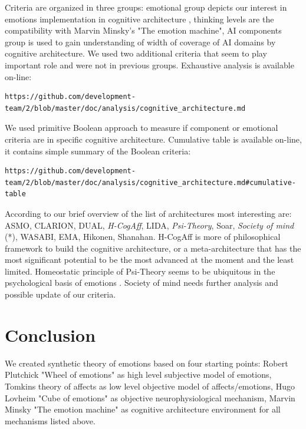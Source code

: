 Criteria are organized in three groups: emotional group depicts our interest in emotions implementation in cognitive architecture \cite{computationalmodelsemotionscognition}, thinking levels are the compatibility with Marvin Minsky's "The emotion machine", AI components group is used to gain understanding of width of coverage of AI domains by cognitive architecture. We used two additional criteria that seem to play important role and were not in previous groups. Exhaustive analysis is available on-line:

\begin{verbatim}
https://github.com/development-team/2/blob/master/doc/analysis/cognitive_architecture.md
\end{verbatim}

We used primitive Boolean approach to measure if component or emotional criteria are in specific cognitive architecture. Cumulative table is available on-line, it contains simple summary of the Boolean criteria:

\begin{verbatim}
https://github.com/development-team/2/blob/master/doc/analysis/cognitive_architecture.md#cumulative-table
\end{verbatim}

According to our brief overview of the list of architectures most interesting are: ASMO, CLARION, DUAL, \emph{H-CogAff}, LIDA, \emph{Psi-Theory}, Soar, \emph{Society of mind} (*), WASABI, EMA, Hikonen, Shanahan.
H-CogAff is more of philosophical framework to build the cognitive architecture, or a meta-architecture that has the most significant potential to be the most advanced at the moment and the least limited. Homeostatic principle of Psi-Theory seems to be ubiquitous in the psychological basis of emotions \cite{natureofemotions}. Society of mind needs further analysis and possible update of our criteria.

\section{Conclusion}

We created synthetic theory of emotions based on four starting points: Robert Plutchick "Wheel of emotions" \cite{natureofemotions, senticcomputing} as high level subjective model of emotions, Tomkins theory of affects \cite{primer_affect_psychology} as low level objective model of affects/emotions, Hugo Lovheim "Cube of emotions" \cite{cubeofemotions} as objective neurophysiological mechanism, Marvin Minsky "The emotion machine" \cite{emotionmachine} as cognitive architecture environment for all mechanisms listed above.

